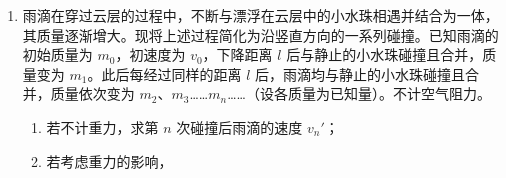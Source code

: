 \documentclass[\gkver]{gaokaozhenti}
\begin{document}
\begin{enumerate}
{figs/23b.png}
{figs/23c.png}

\begin{enumerate}
	\item
	设半导体薄片的宽度（c、f 间距）为 $l$，请写出 $U_{H}$ 和 $E_{H}$ 的关系式；若半导体材料是电子导电的，请判断图 \ref{2010北京理综23a} 中 c、f 哪端的电势高；
	\item
	已知半导体薄片内单位体积中导电的电子数为 $n$，电子的电荷量为 $e$，请导出霍尔系数 $R_{H}$ 的表达式。（通过横截面积 $S$ 的电流 $I=nevS$，其中 $v$ 是导电电子定向移动的平均速率）；
	\item
	图 \ref{2010北京理综23b} 是霍尔测速仪的示意图，将非磁性圆盘固定在转轴上，圆盘的周边等距离地嵌装着 $m$ 个永磁体，相邻永磁体的极性相反。霍尔元件置于被测圆盘的边缘附近。当圆盘匀速转动时，霍尔元件输出的电压脉冲信号图像如图 \ref{2010北京理综23c} 所示。

	（A）若在时间 $t$ 内，霍尔元件输出的脉冲数目为 $P$，请导出圆盘转速 $N$ 的表达式。

	（B）利用霍尔测速仪可以测量汽车行驶的里程。除此之外，请你展开“智慧的翅膀”，提出另一个实例或设想。
\end{enumerate}

\item
雨滴在穿过云层的过程中，不断与漂浮在云层中的小水珠相遇并结合为一体，其质量逐渐增大。现将上述过程简化为沿竖直方向的一系列碰撞。已知雨滴的初始质量为 $m_{0}$，初速度为 $v_{0}$，下降距离 $l$ 后与静止的小水珠碰撞且合并，质量变为 $m_{1}$。此后每经过同样的距离 $l$ 后，雨滴均与静止的小水珠碰撞且合并，质量依次变为 $m_{2}$、$m_{3}$……$m_{n}$……（设各质量为已知量）。不计空气阻力。
\begin{enumerate}
	\item
	若不计重力，求第 $n$ 次碰撞后雨滴的速度 $v_{n}'$；
	\item
	若考虑重力的影响，


\end{enumerate}
\end{enumerate}
\end{document}

